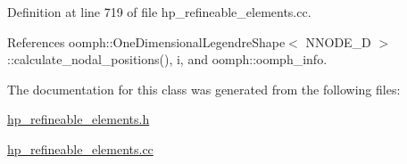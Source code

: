 Definition at line 719 of file hp\+\_\+refineable\+\_\+elements.\+cc.



References oomph\+::\+One\+Dimensional\+Legendre\+Shape$<$ N\+N\+O\+D\+E\+\_\+D $>$\+::calculate\+\_\+nodal\+\_\+positions(), i, and oomph\+::oomph\+\_\+info.



The documentation for this class was generated from the following files\+:\begin{DoxyCompactItemize}
\item 
\hyperlink{hp__refineable__elements_8h}{hp\+\_\+refineable\+\_\+elements.\+h}\item 
\hyperlink{hp__refineable__elements_8cc}{hp\+\_\+refineable\+\_\+elements.\+cc}\end{DoxyCompactItemize}
